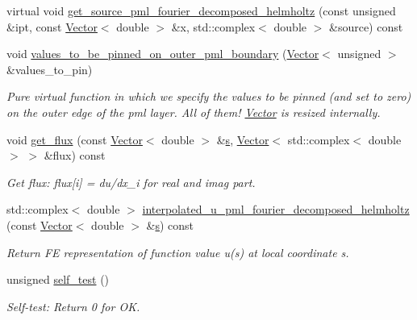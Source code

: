 \begin{DoxyCompactItemize}
virtual void \hyperlink{classoomph_1_1PMLFourierDecomposedHelmholtzEquationsBase_af262bda00a10b8a38dff55854c2e64ce}{get\+\_\+source\+\_\+pml\+\_\+fourier\+\_\+decomposed\+\_\+helmholtz} (const unsigned \&ipt, const \hyperlink{classoomph_1_1Vector}{Vector}$<$ double $>$ \&x, std\+::complex$<$ double $>$ \&source) const
\item 
void \hyperlink{classoomph_1_1PMLFourierDecomposedHelmholtzEquationsBase_a5535891a147803a2ba30264b4f772104}{values\+\_\+to\+\_\+be\+\_\+pinned\+\_\+on\+\_\+outer\+\_\+pml\+\_\+boundary} (\hyperlink{classoomph_1_1Vector}{Vector}$<$ unsigned $>$ \&values\+\_\+to\+\_\+pin)
\begin{DoxyCompactList}\small\item\em Pure virtual function in which we specify the values to be pinned (and set to zero) on the outer edge of the pml layer. All of them! \hyperlink{classoomph_1_1Vector}{Vector} is resized internally. \end{DoxyCompactList}\item 
void \hyperlink{classoomph_1_1PMLFourierDecomposedHelmholtzEquationsBase_a303565df899a7b4ad9e46ce98eade447}{get\+\_\+flux} (const \hyperlink{classoomph_1_1Vector}{Vector}$<$ double $>$ \&\hyperlink{cfortran_8h_ab7123126e4885ef647dd9c6e3807a21c}{s}, \hyperlink{classoomph_1_1Vector}{Vector}$<$ std\+::complex$<$ double $>$ $>$ \&flux) const
\begin{DoxyCompactList}\small\item\em Get flux\+: flux\mbox{[}i\mbox{]} = du/dx\+\_\+i for real and imag part. \end{DoxyCompactList}\item 
std\+::complex$<$ double $>$ \hyperlink{classoomph_1_1PMLFourierDecomposedHelmholtzEquationsBase_a9aec447e212821e9c1c18380c8f14017}{interpolated\+\_\+u\+\_\+pml\+\_\+fourier\+\_\+decomposed\+\_\+helmholtz} (const \hyperlink{classoomph_1_1Vector}{Vector}$<$ double $>$ \&\hyperlink{cfortran_8h_ab7123126e4885ef647dd9c6e3807a21c}{s}) const
\begin{DoxyCompactList}\small\item\em Return FE representation of function value u(s) at local coordinate s. \end{DoxyCompactList}\item 
unsigned \hyperlink{classoomph_1_1PMLFourierDecomposedHelmholtzEquationsBase_a9fd7dac4497a8c7fb47a02407dedf30f}{self\+\_\+test} ()
\begin{DoxyCompactList}\small\item\em Self-\/test\+: Return 0 for OK. \end{DoxyCompactList}\end{DoxyCompactItemize}
